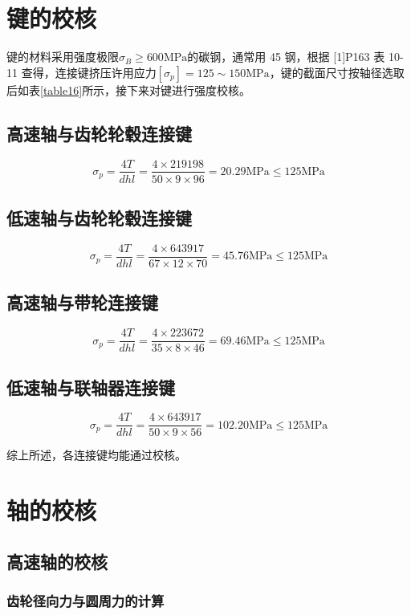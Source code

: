 \documentclass[12pt]{ctexart}
\begin{document}
\section{键的校核}

键的材料采用强度极限$\sigma_B\ge 600\text{MPa}$的碳钢，通常用 45 钢，根据 [1]P163 表 10-11 查得，连接键挤压许用应力$[\sigma_p]=125\sim 150\text{MPa}$，键的截面尺寸按轴径选取后如表\ref{table16}所示，接下来对键进行强度校核。


\subsection{高速轴与齿轮轮毂连接键}

$$\sigma_p=\frac{4T}{dhl}=\frac{4\times 219198}{50\times 9\times 96}=20.29\text{MPa}\le 125\text{MPa}$$

\subsection{低速轴与齿轮轮毂连接键}

$$\sigma_p=\frac{4T}{dhl}=\frac{4\times 643917}{67\times 12\times 70}=45.76\text{MPa}\le 125\text{MPa}$$

\subsection{高速轴与带轮连接键}

$$\sigma_p=\frac{4T}{dhl}=\frac{4\times 223672}{35\times 8\times 46}=69.46\text{MPa}\le 125\text{MPa}$$

\subsection{低速轴与联轴器连接键}

$$\sigma_p=\frac{4T}{dhl}=\frac{4\times 643917}{50\times 9\times 56}=102.20\text{MPa}\le 125\text{MPa}$$

综上所述，各连接键均能通过校核。

\section{轴的校核}

\subsection{高速轴的校核}
\subsubsection{齿轮径向力与圆周力的计算}
\end{document}
